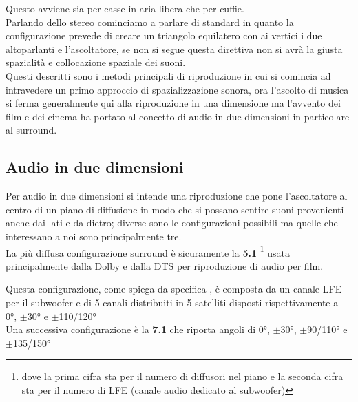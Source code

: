 \documentclass[12pt,a4paper]{report}
\begin{document}
Questo avviene sia per casse in aria libera che per cuffie. \\

Parlando dello stereo cominciamo a parlare di standard in quanto la configurazione prevede di creare un triangolo equilatero con ai vertici i due altoparlanti e l'ascoltatore, se non si segue questa direttiva non si avrà la giusta spazialità e collocazione spaziale dei suoni.\\

Questi descritti sono i metodi principali di riproduzione in cui si comincia ad intravedere un primo approccio di spazializzazione	 sonora, ora l'ascolto di musica si ferma generalmente qui alla riproduzione in una dimensione ma l'avvento dei film e dei cinema ha portato al concetto di audio in due dimensioni in particolare al surround.

\subsection{Audio in due dimensioni}

Per audio in due dimensioni si intende una riproduzione che pone l'ascoltatore al centro di un piano di diffusione in modo che si possano sentire suoni provenienti anche dai lati e da dietro; diverse sono le configurazioni possibili ma quelle che interessano a noi sono principalmente tre.\\

La più diffusa configurazione surround è sicuramente la \textbf{5.1} \footnote{dove la prima cifra sta per il numero di diffusori nel piano e la seconda cifra sta per il numero di LFE (canale audio dedicato al subwoofer)} usata principalmente dalla Dolby e dalla DTS per riproduzione di audio per film.


Questa configurazione, come spiega da specifica \cite{5.1}, è composta da un canale LFE per il subwoofer e di 5 canali distribuiti in 5 satelliti disposti rispettivamente a 0°, $\pm$30° e $\pm$110/120°\\

Una successiva configurazione è la \textbf{7.1} che riporta angoli di 0°, $\pm$30°, $\pm$90/110° e $\pm$135/150°
\end{document}
